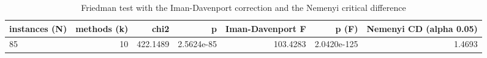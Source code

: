 \begin{table}[htbp]
\centering
\small
\caption{Friedman test with the Iman-Davenport correction and the Nemenyi critical difference}
\label{tab:E2b_head_to_head_budgets_b10_friedman_test}
\begin{tabular}{lrrrrrr}
\toprule
instances (N) & methods (k) & chi2 & p & Iman-Davenport F & p (F) & Nemenyi CD (alpha 0.05) \\
\midrule
85 & 10 & 422.1489 & 2.5624e-85 & 103.4283 & 2.0420e-125 & 1.4693 \\
\bottomrule
\end{tabular}
\end{table}
